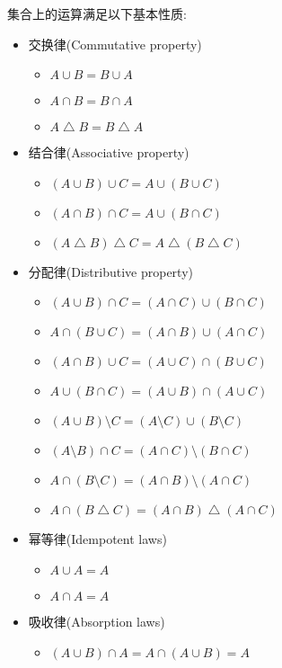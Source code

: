 \begin{theorem}
	集合上的运算满足以下基本性质:

	\begin{itemize}
		\item 交换律(Commutative property)
			\begin{itemize}
				\item[] $A\cup B=B\cup A$
				\item[] $A\cap B=B\cap A$
				\item[] $A\bigtriangleup B=B\bigtriangleup A$
			\end{itemize}
		\item 结合律(Associative property)
			\begin{itemize}
				\item[] $(A\cup B)\cup C=A\cup (B\cup C)$
				\item[] $(A\cap B)\cap C=A\cup (B\cap C)$
				\item[] $(A\bigtriangleup B)\bigtriangleup C=A\bigtriangleup (B\bigtriangleup C)$
			\end{itemize}
		\item 分配律(Distributive property)
			\begin{itemize}
				\item[] $(A\cup B)\cap C=(A\cap C)\cup (B\cap C)$
				\item[] $A\cap (B\cup C)=(A\cap B)\cup (A\cap C)$
				\item[] $(A\cap B)\cup C=(A\cup C)\cap (B\cup C)$
				\item[] $A\cup (B\cap C)=(A\cup B)\cap (A\cup C)$
				\item[] $(A\cup B)\setminus C=(A\setminus C)\cup (B\setminus C)$
				\item[] $(A\setminus B)\cap C=(A\cap C)\setminus (B\cap C)$
				\item[] $A\cap (B\setminus C)=(A\cap B)\setminus (A\cap C)$
				\item[] $A\cap (B\bigtriangleup C)=(A\cap B)\bigtriangleup (A\cap C)$
			\end{itemize}
		\item 幂等律(Idempotent laws)
			\begin{itemize}
				\item[] $A\cup A=A$
				\item[] $A\cap A=A$
			\end{itemize}
		\item 吸收律(Absorption laws)
			\begin{itemize}
				\item[] $(A\cup B)\cap A=A\cap (A\cup B)=A$

\end{itemize}
\end{itemize}
\end{theorem}
